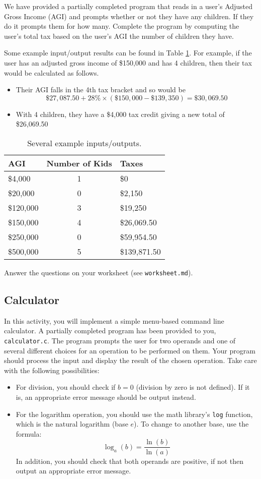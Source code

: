 \documentclass[12pt]{scrartcl}
\begin{document}
We have provided a partially completed program that reads in a user's 
Adjusted Gross Income (AGI) and prompts whether or not they have 
any children.  If they do it prompts them for how many.  Complete
the program by computing the user's total tax based on the user's AGI 
the number of children they have.

Some example input/output results can be found in Table \ref{table:examples}.
For example, if the user has an adjusted gross income of \$150,000 and has
4 children, then their tax would be calculated as follows.
\begin{itemize}
  \item Their AGI falls in the 4th tax bracket and so would be
    $$\$27,087.50 + 28\% \times (\$150,000 - \$139,350) = \$30,069.50$$
  \item With 4 children, they have a \$4,000 tax credit giving a new total of \$26,069.50
\end{itemize}

\begin{table}
\centering
\begin{tabular}{l|c|l}
AGI & Number of Kids & Taxes \\
\hline\hline
\$4,000 & 1 & \$0 \\
\$20,000 & 0 & \$2,150 \\
\$120,000 & 3 & \$19,250 \\
\$150,000 & 4 & \$26,069.50 \\
\$250,000 & 0 & \$59,954.50 \\
\$500,000 & 5 & \$139,871.50 \\
\end{tabular}
\caption{Several example inputs/outputs.}
\label{table:examples}
\end{table}

Answer the questions on your worksheet (see \texttt{worksheet.md}).

\subsection{Calculator}

In this activity, you will implement a simple menu-based command line 
calculator.  A partially completed program has been provided to you, 
\texttt{calculator.c}.  The program prompts the user for two operands 
and one of several different choices for an operation to be performed on 
them.  Your program should process the input and display the result of 
the chosen operation.  Take care with the following possibilities:
\begin{itemize}
  \item For division, you should check if $b = 0$ (division by zero is not defined).  
  	If it is, an appropriate error message should be output instead.
  \item For the logarithm operation, you should use the math library's \texttt{log} 
	function, which is the natural logarithm (base $e$).  To change to another
	 base, use the formula:
	 	$$\log_a{(b)} = \frac{\ln(b)}{\ln(a)}$$
In addition, you should check that both operands are positive, if not 
then output an appropriate error message.
\end{itemize}
\end{document}

